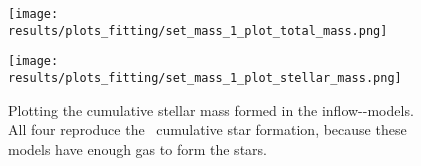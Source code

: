 \begin{figure}[h]
  \begin{minipage}[t][][t]{0.49\textwidth}
  \centering
  \texttt{[image: results/plots\_fitting/set\_mass\_1\_plot\_total\_mass.png]}
  \caption[Total mass of \fiduccialomega for initial/inflow mass-fitting]{\label{fig:fit-v1-1-total}
    The total baryonic mass of the \omegamodel-model for four different initial/inflow parameters.
    $M_0$ is the initial primordial gas of the galaxy(in \msol), $\dot{M}$ is the inflow (in \msol/yr).
    This visualization shows that 44G\msol and 3.7\msol/yr are the optimal parameters to reproduce the two baryonic data-points from \eris, although more then these four were tried.
  }
  \end{minipage}
  \begin{minipage}[t][][t]{0.49\textwidth}
  \centering
  \texttt{[image: results/plots\_fitting/set\_mass\_1\_plot\_stellar\_mass.png]}
  \caption[Stellar mass of \fiduccialomega for initial/inflow mass-fitting]{
    \label{fig:fit-v1-1-stellar}
    Plotting the cumulative stellar mass formed in the inflow-\omegamodel-models. All four reproduce the \eris\ cumulative star formation, because these models have enough gas to form the stars.
  }
  \end{minipage}
\end{figure}

